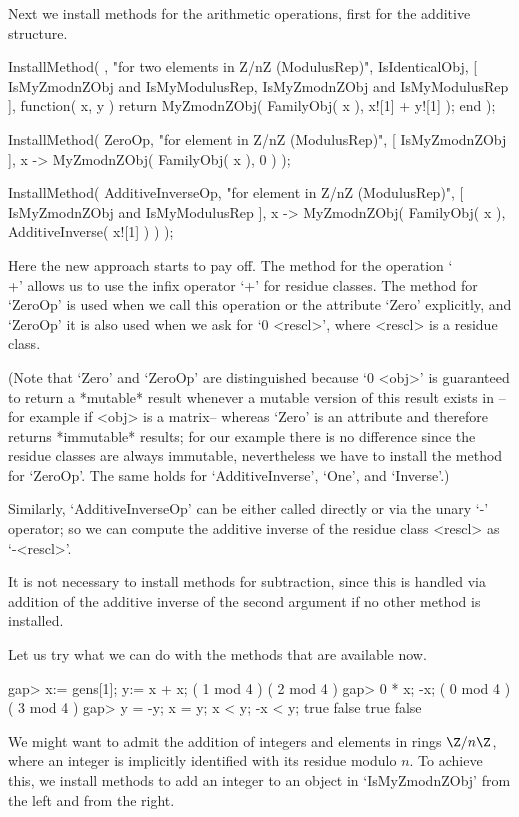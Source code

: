 Next we install methods for the arithmetic operations,
first for the additive structure.

\begintt
InstallMethod( \+,
    "for two elements in Z/nZ (ModulusRep)",
    IsIdenticalObj,
    [ IsMyZmodnZObj and IsMyModulusRep, IsMyZmodnZObj and IsMyModulusRep ],
    function( x, y )
    return MyZmodnZObj( FamilyObj( x ), x![1] + y![1] );
    end );

InstallMethod( ZeroOp,
    "for element in Z/nZ (ModulusRep)",
    [ IsMyZmodnZObj ],
    x -> MyZmodnZObj( FamilyObj( x ), 0 ) );

InstallMethod( AdditiveInverseOp,
    "for element in Z/nZ (ModulusRep)",
    [ IsMyZmodnZObj and IsMyModulusRep ],
    x -> MyZmodnZObj( FamilyObj( x ), AdditiveInverse( x![1] ) ) );
\endtt

Here the new approach starts to pay off.
The method for the operation `\\+' allows us to use the infix
operator `+' for residue classes.
The method for `ZeroOp' is used when we call this operation or the
attribute `Zero' explicitly,
and `ZeroOp' it is also used when we ask for `0 \* <rescl>',
where <rescl> is a residue class.

(Note that `Zero' and `ZeroOp' are distinguished
because `0 \* <obj>' is guaranteed to return a *mutable* result whenever
a mutable version of this result exists in {\GAP} --for example if <obj>
is a matrix-- whereas `Zero' is an attribute and therefore returns
*immutable* results;
for our example there is no difference since the residue classes are
always immutable,
nevertheless we have to install the method for `ZeroOp'.
The same holds for `AdditiveInverse', `One', and `Inverse'.)

Similarly, `AdditiveInverseOp' can be either called directly or via the
unary `-' operator; so we can compute the additive inverse of the
residue class <rescl> as `-<rescl>'.

It is not necessary to install methods for subtraction,
since this is handled via addition of the additive inverse of
the second argument if no other method is installed.

Let us try what we can do with the methods that are available now.

\begintt
gap> x:= gens[1];  y:= x + x;
( 1 mod 4 )
( 2 mod 4 )
gap> 0 * x;  -x;
( 0 mod 4 )
( 3 mod 4 )
gap> y = -y;  x = y;  x < y;  -x < y;
true
false
true
false
\endtt

We might want to admit the addition of integers and elements in
rings $\Z/n\Z$, where an integer is implicitly identified
with its residue modulo $n$.
To achieve this, we install methods to add an integer to an object in
`IsMyZmodnZObj' from the left and from the right.

